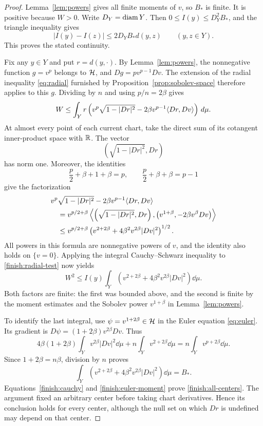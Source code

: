 \begin{proof}
Lemma~\ref{lem:powers} gives all finite moments of \(v\), so \(B_*\) is
finite. It is positive because \(W>0\). Write \(D_Y=\operatorname{diam} Y\). Then
\(0\le I(y)\le D_Y^2B_*\), and the triangle inequality gives
\[
 |I(y)-I(z)|\le2D_YB_*d(y,z)\qquad(y,z\in Y).
\]
This proves the stated continuity.

Fix any \(y\in Y\) and put \(r=d(y,\cdot)\). By
Lemma~\ref{lem:powers}, the nonnegative function \(g=v^p\) belongs to
\(\mathcal H\), and \(Dg=pv^{p-1}Dv\). The extension of the radial inequality
\eqref{eq:radial} furnished by Proposition~\ref{prop:sobolev-space}
therefore applies to this \(g\). Dividing by \(n\) and using
\(p/n=2\beta\) gives
\begin{equation}
 \label{finish:radial-test}
 W\le\int_Y r\left(v^p\sqrt{1-|Dr|^2}
             -2\beta v^{p-1}\langle Dr,Dv\rangle\right)\,d\mu.
\end{equation}
At almost every point of each current chart, take the direct sum of its
cotangent inner-product space with \(\mathbb R\). The vector
\[
 \left(\sqrt{1-|Dr|^2},Dr\right)
\]
has norm one. Moreover, the identities
\[
 \frac p2+\beta+1+\beta=p,
 \qquad
 \frac p2+\beta+\beta=p-1
\]
give the factorization
\begin{align*}
 &v^p\sqrt{1-|Dr|^2}-2\beta v^{p-1}\langle Dr,Dv\rangle\\
 &\quad=
 v^{p/2+\beta}
 \left\langle
   \left(\sqrt{1-|Dr|^2},Dr\right),
   \left(v^{1+\beta},-2\beta v^\beta Dv\right)
 \right\rangle\\
 &\quad\le
 v^{p/2+\beta}
 \left(v^{2+2\beta}+4\beta^2v^{2\beta}|Dv|^2\right)^{1/2}.
\end{align*}
All powers in this formula are nonnegative powers of \(v\), and the
identity also holds on \(\{v=0\}\). Applying the integral
Cauchy--Schwarz inequality to \eqref{finish:radial-test} now yields
\begin{equation}
 \label{finish:cauchy}
 W^2\le I(y)
 \int_Y\left(v^{2+2\beta}
             +4\beta^2v^{2\beta}|Dv|^2\right)\dd\mu.
\end{equation}
Both factors are finite: the first was bounded above, and the second is
finite by the moment estimates and the Sobolev power
\(v^{1+\beta}\) in Lemma~\ref{lem:powers}.

To identify the last integral, use
\(\psi=v^{1+2\beta}\in\mathcal H\) in the Euler equation
\eqref{eq:euler}. Its gradient is
\(D\psi=(1+2\beta)v^{2\beta}Dv\). Thus
\[
 4\beta(1+2\beta)\int_Yv^{2\beta}|Dv|^2\dd\mu
 +n\int_Yv^{2+2\beta}\dd\mu
 =n\int_Yv^{p+2\beta}\dd\mu.
\]
Since \(1+2\beta=n\beta\), division by \(n\) proves
\begin{equation}
 \label{finish:euler-moment}
 \int_Y\left(v^{2+2\beta}
             +4\beta^2v^{2\beta}|Dv|^2\right)\dd\mu=B_*.
\end{equation}
Equations~\eqref{finish:cauchy} and \eqref{finish:euler-moment}
prove \eqref{finish:all-centers}. The argument fixed an arbitrary center
before taking chart derivatives. Hence its conclusion holds for every
center, although the null set on which \(Dr\) is undefined may depend
on that center.


\end{proof}
